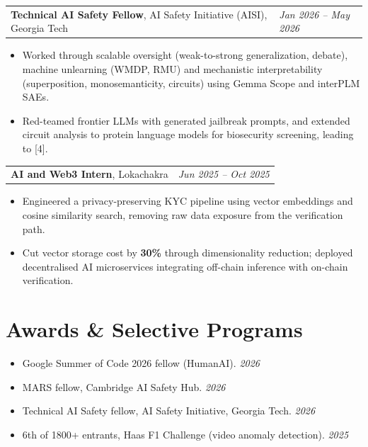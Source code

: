 \documentclass[letterpaper,10pt]{article}
\makeatletter
\newcommand{\cventry}[2]{%
    \begin{tabularx}{\textwidth}{@{}>{\raggedright\arraybackslash}X@{\hspace{8pt}}>{\raggedleft\arraybackslash}p{1.75in}@{}}
      #1 & \textit{\small #2}
    \end{tabularx}
}
\makeatother
\begin{document}
\vspace{3pt}
\cventry{\textbf{Technical AI Safety Fellow}, AI Safety Initiative (AISI), Georgia Tech}{Jan 2026 -- May 2026}
\begin{itemize}[leftmargin=0.2in, itemsep=1pt, topsep=2pt, parsep=0pt]
  \item \small Worked through scalable oversight (weak-to-strong generalization, debate), machine unlearning (WMDP, RMU) and mechanistic interpretability (superposition, monosemanticity, circuits) using Gemma Scope and interPLM SAEs.
  \item \small Red-teamed frontier LLMs with generated jailbreak prompts, and extended circuit analysis to protein language models for biosecurity screening, leading to [4].
\end{itemize}

\vspace{3pt}
\cventry{\textbf{AI and Web3 Intern}, Lokachakra}{Jun 2025 -- Oct 2025}
\begin{itemize}[leftmargin=0.2in, itemsep=1pt, topsep=2pt, parsep=0pt]
  \item \small Engineered a privacy-preserving KYC pipeline using vector embeddings and cosine similarity search, removing raw data exposure from the verification path.
  \item \small Cut vector storage cost by \textbf{30\%} through dimensionality reduction; deployed decentralised AI microservices integrating off-chain inference with on-chain verification.
\end{itemize}

\section{Awards \& Selective Programs}
\begin{itemize}[leftmargin=0.2in, itemsep=1pt, topsep=2pt, parsep=0pt]
  \item \small Google Summer of Code 2026 fellow (HumanAI). \hfill \textit{\small 2026}
  \item \small MARS fellow, Cambridge AI Safety Hub. \hfill \textit{\small 2026}
  \item \small Technical AI Safety fellow, AI Safety Initiative, Georgia Tech. \hfill \textit{\small 2026}
  \item \small 6th of 1800+ entrants, Haas F1 Challenge (video anomaly detection). \hfill \textit{\small 2025}
\end{itemize}
\end{document}
